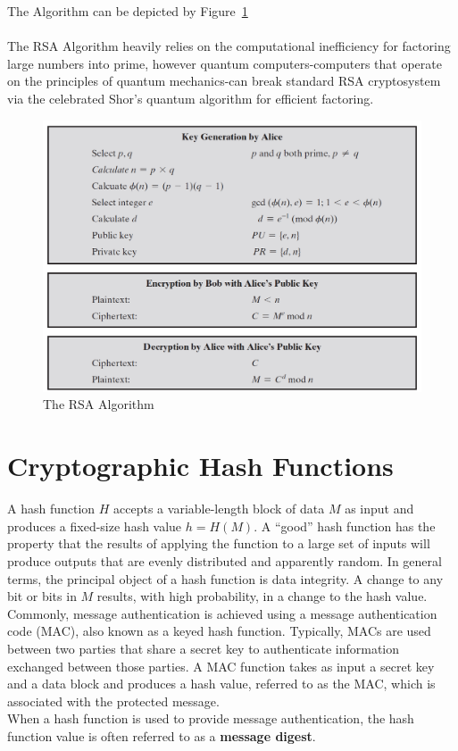 \documentclass{article}
\begin{document}
The Algorithm can be depicted by Figure~\ref{fig:rsa}\\\\
The RSA Algorithm heavily relies on the computational inefficiency for factoring large numbers into prime, however quantum computers-computers that operate on the principles of quantum mechanics-can break standard RSA cryptosystem
via the celebrated Shor's quantum algorithm for efficient factoring.

\begin{figure}[!h]
    \centering
    \includegraphics[width=\textwidth]{rsa.png}
    \caption{The RSA Algorithm \cite{rsa}}
    \label{fig:rsa}
\end{figure}

\section{Cryptographic Hash Functions}
A hash function $H$ accepts a variable-length block of data $M$ as input and produces
a fixed-size hash value $h = H(M)$. A “good” hash function has the property that the
results of applying the function to a large set of inputs will produce outputs that are
evenly distributed and apparently random. In general terms, the principal object of
a hash function is data integrity. A change to any bit or bits in $M$ results, with high
probability, in a change to the hash value.\\
Commonly, message authentication is achieved using a message
authentication code (MAC), also known as a keyed hash function. Typically, MACs
are used between two parties that share a secret key to authenticate information
exchanged between those parties. A MAC function takes as input a secret key and
a data block and produces a hash value, referred to as the MAC, which is associated
with the protected message.\\
When a hash function is used to provide message authentication,
the hash function value is often referred to as a {\bfseries message digest}.
\end{document}
